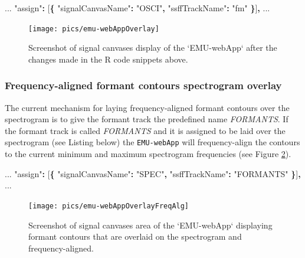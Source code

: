 \documentclass[]{book}
\newenvironment{Shaded}{\begin{snugshade}}{\end{snugshade}}
\newcommand{\NormalTok}[1]{#1}
\newcommand{\OperatorTok}[1]{\textcolor[rgb]{0.81,0.36,0.00}{\textbf{#1}}}
\newcommand{\StringTok}[1]{\textcolor[rgb]{0.31,0.60,0.02}{#1}}
\begin{document}
\begin{Shaded}
\begin{Highlighting}[]
\NormalTok{...}
\StringTok{"assign"}\OperatorTok{:}\NormalTok{ [}\OperatorTok{\{}
    \StringTok{"signalCanvasName"}\OperatorTok{:} \StringTok{"OSCI"}\OperatorTok{,}
    \StringTok{"ssffTrackName"}\OperatorTok{:} \StringTok{"fm"}
\OperatorTok{\}}\NormalTok{]}\OperatorTok{,}
\NormalTok{...}
\end{Highlighting}
\end{Shaded}

\begin{figure}

{\centering \texttt{[image: pics/emu-webAppOverlay]} 

}

\caption{Screenshot of signal canvases display of the `EMU-webApp` after the changes made in the R code snippets above.}\label{fig:webApp-overlay1}
\end{figure}

\hypertarget{frequency-aligned-formant-contours-spectrogram-overlay}{%
\subsubsection*{Frequency-aligned formant contours spectrogram overlay}\label{frequency-aligned-formant-contours-spectrogram-overlay}}

The current mechanism for laying frequency-aligned formant contours over the spectrogram is to give the formant track the predefined name \emph{FORMANTS}. If the formant track is called \emph{FORMANTS} and it is assigned to be laid over the spectrogram (see Listing below) the \texttt{EMU-webApp} will frequency-align the contours to the current minimum and maximum spectrogram frequencies (see Figure \ref{fig:webApp-overlay2}).

\begin{Shaded}
\begin{Highlighting}[]
\NormalTok{...}
\StringTok{"assign"}\OperatorTok{:}\NormalTok{ [}\OperatorTok{\{}
    \StringTok{"signalCanvasName"}\OperatorTok{:} \StringTok{"SPEC"}\OperatorTok{,}
    \StringTok{"ssffTrackName"}\OperatorTok{:} \StringTok{"FORMANTS"}
\OperatorTok{\}}\NormalTok{]}\OperatorTok{,}
\NormalTok{...}
\end{Highlighting}
\end{Shaded}

\begin{figure}

{\centering \texttt{[image: pics/emu-webAppOverlayFreqAlg]} 

}

\caption{Screenshot of signal canvases area of the `EMU-webApp` displaying formant contours that are overlaid on the spectrogram and frequency-aligned.}\label{fig:webApp-overlay2}
\end{figure}
\end{document}
